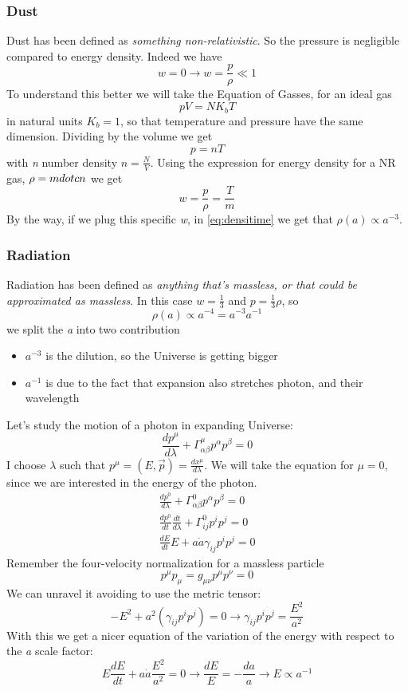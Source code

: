 \subsubsection{Dust}
Dust has been defined as \emph{something non-relativistic}. So the pressure is negligible compared to energy density. Indeed we have 
\[
w = 0 \to w = \frac{p}{\rho }\ll 1
\]
To understand this better we will take the Equation of Gasses, for an ideal gas
\[
pV = NK_{b}T
\]
in natural units $K_{b}=1$, so that temperature and pressure have the same dimension. Dividing by the volume we get
\[
p = nT
\]
with \emph{n} number density $n = \frac{N}{V}$. Using the expression for energy density for a NR gas, $\rho = m\\dot{c}n$ we get
\[
w = \frac{p}{\rho }  = \frac{T}{m}
\]
By the way, if we plug this specific \emph{w}, in \ref{eq:densitime} we get that $\rho \left( a \right) \propto a^{-3}  $.

\subsubsection{Radiation}
Radiation has been defined as \emph{anything that's massless, or that could be approximated as massless}. In this case $w = \frac{1}{3}$ and $p = \frac{1}{3}\rho $, so 
\[
\rho \left( a \right) \propto a^{-4} = a^{-3}a^{-1}
\]
we split the \emph{a} into two contribution
\begin{itemize}
\item $a^{-3}$ is the dilution, so the Universe is getting bigger
\item $a^{-1}$ is due to the fact that expansion also stretches photon, and their wavelength
\end{itemize}
Let's study the motion of a photon in expanding Universe:
\[
	\frac{d p^{\mu }}{d \lambda } + \Gamma _{\alpha \beta }^{\mu }p^{\alpha }p^{\beta } =0
\]
I choose $\lambda $ such that $p^{\mu } = \left( E, \vec{p} \right) = \frac{d x^{\mu }}{d \lambda }$. We will take the equation for $\mu  = 0$, since we are interested in the energy of the photon.
\begin{gather*}
\frac{d p^{0}}{d \lambda } + \Gamma ^{0}_{\alpha \beta }p^{\alpha }p^{\beta } = 0\\
\frac{d p^{0}}{d t}\frac{d t}{d \lambda } + \Gamma ^{0}_{ij}p^{i}p^{j} = 0 \\
\frac{d E}{d t} E + a \dot{a} \gamma _{ij}p^{i}p^{j} = 0
\end{gather*}
Remember the four-velocity normalization for a massless particle 
\[
p^{\mu }p_{\mu } = g_{\mu \nu }p^{\mu }p^{\nu }=0
\]
We can unravel it avoiding to use the metric tensor:
\[
-E^{2} + a^{2}\left( \gamma _{ij}p^{i}p^{j} \right) = 0 \to  \gamma _{ij}p^{i}p^{j} = \frac{E^{2}}{a^{2}}
\]
With this we get a nicer equation of the variation of the energy with respect to the \emph{a} scale factor:
\[
E \frac{d E}{d t} + a \dot{a} \frac{E^{2}}{a^{2}} = 0 \to  \frac{d E}{E} = -\frac{d a}{a} \to E\propto a^{-1}
\]

